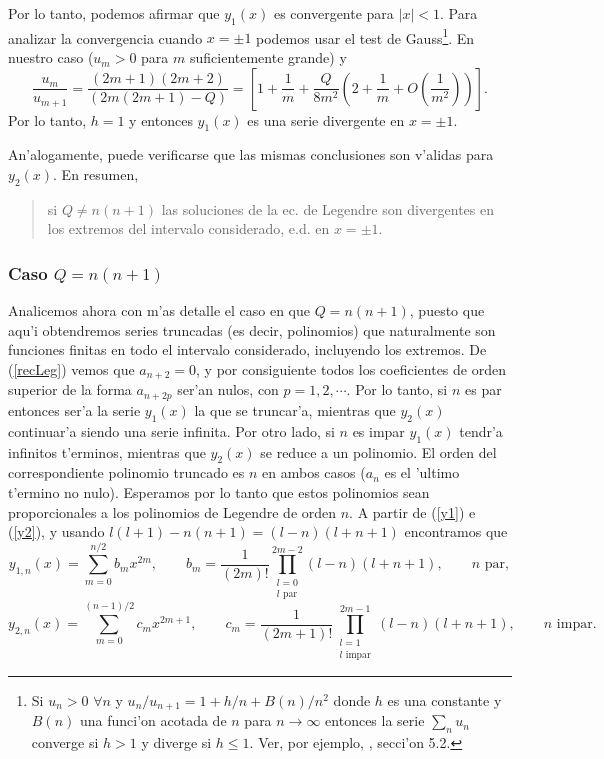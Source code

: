 Por lo tanto, podemos afirmar que $y_1(x)$ es convergente para $|x|<1$. Para analizar la convergencia cuando $x=\pm 1$ podemos usar el test de Gauss\footnote{Si $u_n>0$ $\forall n$ y $u_n/u_{n+1}=1+h/n+B(n)/n^2$ donde $h$ es una constante y $B(n)$ una funci'on acotada de $n$ para $n\to\infty$ entonces la serie $\sum_n u_n$ converge si $h>1$ y diverge si $h\le 1$. Ver, por ejemplo, \cite{Arfken}, secci'on 5.2.}. En nuestro caso ($u_m>0$ para $m$ suficientemente grande) y 
\begin{equation}
\frac{u_m}{u_{m+1}}=\frac{(2m+1)(2m+2)}{(2m(2m+1)-Q)}=\left[1+\frac{1}{m}+\frac{Q}{8m^2}\left(2+\frac{1}{m}+O(\frac{1}{m^2})\right)\right].
\end{equation}
Por lo tanto, $h=1$ y entonces $y_1(x)$ es una serie divergente en $x=\pm 1$.

An'alogamente, puede verificarse que las mismas conclusiones son v'alidas para $y_2(x)$. En resumen, 

\begin{quote}
si $Q\neq n(n+1)$ las soluciones de la ec. de Legendre son divergentes en los extremos del intervalo considerado, e.d. en $x=\pm 1$.
\end{quote}

\subsubsection{Caso $Q=n(n+1)$}
Analicemos ahora con m'as detalle el caso en que $Q=n(n+1)$, puesto que aqu'i obtendremos series truncadas (es decir, polinomios) que naturalmente son funciones finitas en todo el intervalo considerado, incluyendo los extremos. De (\ref{recLeg}) vemos que $a_{n+2}=0$, y por consiguiente todos los coeficientes de orden superior de la forma $a_{n+2p}$ ser'an nulos, con $p=1,2,\cdots$. Por lo tanto, si $n$ es par entonces ser'a la serie $y_1(x)$ la que se truncar'a, mientras que $y_2(x)$ continuar'a siendo una serie infinita. Por otro lado, si $n$ es impar $y_1(x)$ tendr'a infinitos t'erminos, mientras que $y_2(x)$ se reduce a un polinomio. El orden del correspondiente polinomio truncado es $n$ en ambos casos ($a_n$ es el 'ultimo t'ermino no nulo). Esperamos por lo tanto que estos polinomios sean proporcionales a los polinomios de Legendre de orden $n$. A partir de (\ref{y1}) e (\ref{y2}), y usando $l(l+1)-n(n+1)=(l-n)(l+n+1)$ encontramos que
\begin{equation}\label{y1n1}
y_{1,n}(x) = \sum_{m= 0}^{n/2}b_mx^{2m}, \qquad b_m=\frac{1}{(2m)!}
\prod_{\substack{l=0 \\ l \text{ par}}}^{2m-2}
(l-n)(l+n+1), \qquad n\text{ par},
\end{equation}
\begin{equation}\label{y2n1}
y_{2,n}(x)=\sum_{m= 0}^{(n-1)/2}c_mx^{2m+1}, \qquad c_m =\frac{1}{(2m+1)!}
\prod_{\substack{l=1 \\ l \text{ impar}}}^{2m-1}
 (l-n)(l+n+1), \qquad n\text{ impar}.
\end{equation}

